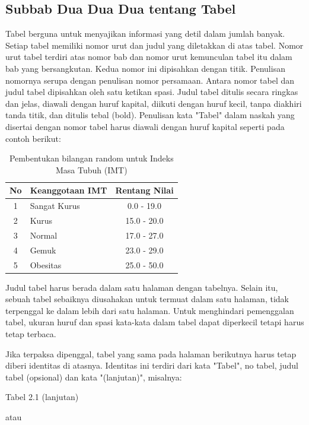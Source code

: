 \subsection{Subbab Dua Dua Dua tentang Tabel}

Tabel berguna untuk menyajikan informasi yang detil dalam jumlah banyak. Setiap tabel memiliki nomor urut dan judul yang diletakkan di atas tabel. Nomor urut tabel terdiri atas nomor bab dan nomor urut kemunculan tabel itu dalam bab yang bersangkutan. Kedua nomor ini dipisahkan dengan titik. Penulisan nomornya serupa dengan penulisan nomor persamaan. Antara nomor tabel dan judul tabel dipisahkan oleh satu ketikan spasi. Judul tabel ditulis secara ringkas dan jelas, diawali dengan huruf kapital, diikuti dengan huruf kecil, tanpa diakhiri tanda titik, dan ditulis tebal (bold). Penulisan kata "Tabel" dalam naskah yang disertai dengan nomor tabel harus diawali dengan huruf kapital seperti pada contoh berikut: 

\begin{table}
  \caption{Pembentukan bilangan random untuk Indeks Masa Tubuh (IMT)}
  \centering
  \renewcommand{\arraystretch}{1.2}
  \begin{tabular}[ht]{clc}
    \hline
    No & Keanggotaan IMT & Rentang Nilai \\
    \hline
    1 & Sangat Kurus & 0.0 - 19.0 \\
    2 & Kurus & 15.0 - 20.0 \\
    3 & Normal & 17.0 - 27.0 \\
    4 & Gemuk & 23.0 - 29.0 \\
    5 & Obesitas & 25.0 - 50.0 \\
    \hline
  \end{tabular}
\end{table}

Judul tabel harus berada dalam satu halaman dengan tabelnya. Selain itu, sebuah tabel sebaiknya diusahakan untuk termuat dalam satu halaman, tidak terpenggal ke dalam lebih dari satu halaman. Untuk menghindari pemenggalan tabel, ukuran huruf dan spasi kata-kata dalam tabel dapat diperkecil tetapi harus tetap terbaca. 

Jika terpaksa dipenggal, tabel yang sama pada halaman berikutnya harus tetap diberi identitas di atasnya. Identitas ini terdiri dari kata "Tabel", no tabel, judul tabel (opsional) dan kata "(lanjutan)", misalnya:

Tabel 2.1 (lanjutan)  

atau

